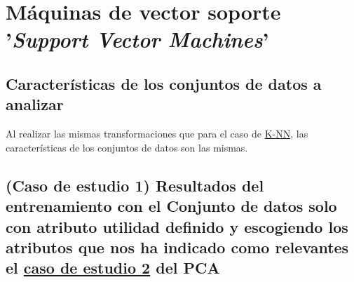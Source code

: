 \section{Máquinas de vector soporte '\textit{Support Vector Machines}'}
\label{resultados:svm}

\subsection{Características de los conjuntos de datos a analizar}
\label{resultados:rf_caracteristicas}
Al realizar las mismas transformaciones que para el caso de \hyperref[resultados:knn_caracteristicas]{K-NN}, las características de los conjuntos de datos son las mismas.

\subsection{(Caso de estudio 1) Resultados del entrenamiento con el Conjunto de datos solo con atributo utilidad definido y escogiendo los atributos que nos ha indicado como relevantes el \hyperref[result:pca_case2]{caso de estudio 2} del PCA}

